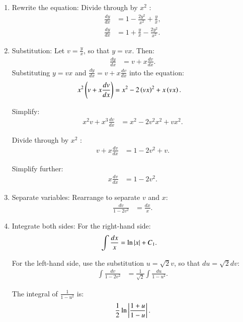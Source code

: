 \documentclass[journal]{IEEEtran}
\begin{document}
\begin{enumerate}

\item Rewrite the equation:  
Divide through by $x^2$ :
\begin{align}
\frac{dy}{dx} &= 1 - \frac{2y^2}{x^2} + \frac{y}{x}, \\
\frac{dy}{dx} &= 1 + \frac{y}{x} - \frac{2y^2}{x^2}.
\end{align}

\item Substitution:  
Let $v = \frac{y}{x}$, so that $y = vx$. Then:
\begin{align}
\frac{dy}{dx} &= v + x \frac{dv}{dx}.
\end{align}
Substituting $y = vx$ and $\frac{dy}{dx} = v + x\frac{dv}{dx}$ into the equation:
\begin{align}
x^2 \left(v + x \frac{dv}{dx}\right) &= x^2 - 2 \left(vx\right)^2 + x \left(vx\right).
\end{align}

Simplify:
\begin{align}
x^2 v + x^3 \frac{dv}{dx} &= x^2 - 2v^2 x^2 + vx^2.
\end{align}

Divide through by $x^2$ :
\begin{align}
v + x \frac{dv}{dx} &= 1 - 2v^2 + v.
\end{align}

Simplify further:
\begin{align}
x \frac{dv}{dx} &= 1 - 2v^2.
\end{align}

\item Separate variables:  
Rearrange to separate $v$ and $x$:
\begin{align}
\frac{dv}{1 - 2v^2} &= \frac{dx}{x}.
\end{align}

\item Integrate both sides:  
For the right-hand side:
\begin{align}
\int \frac{dx}{x} &= \ln\left\vert x\right\vert + C_1.
\end{align}

For the left-hand side, use the substitution $u = \sqrt{2}v$, so that $du = \sqrt{2} dv$:
\begin{align}
\int \frac{dv}{1 - 2v^2} &= \frac{1}{\sqrt{2}} \int \frac{du}{1 - u^2}.
\end{align}

The integral of $\frac{1}{1 - u^2}$ is:
\begin{align}
\frac{1}{2} \ln \left\vert\frac{1 + u}{1 - u}\right\vert.
\end{align}


\end{enumerate}
\end{document}
